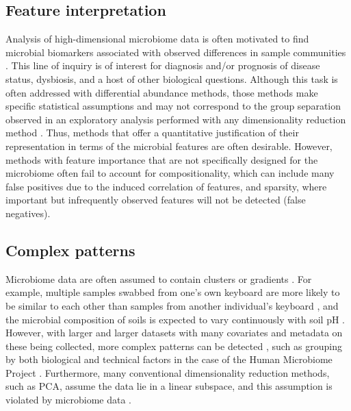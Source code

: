 \subsection{Feature interpretation} Analysis of high-dimensional microbiome data is often motivated to find microbial biomarkers associated with observed differences in sample communities \cite{Fedarko2020-oy}. This line of inquiry is of interest for diagnosis and/or prognosis of disease status, dysbiosis, and a host of other biological questions. Although this task is often addressed with differential abundance methods, those methods make specific statistical assumptions and may not correspond to the group separation observed in an exploratory analysis performed with any dimensionality reduction method \cite{Lin2020-vq}. Thus, methods that offer a quantitative justification of their representation in terms of the microbial features are often desirable. However, methods with feature importance that are not specifically designed for the microbiome often fail to account for compositionality, which can include many false positives due to the induced correlation of features, and sparsity, where important but infrequently observed features will not be detected (false negatives).

\subsection{Complex patterns} Microbiome data are often assumed to contain clusters or gradients \cite{Kuczynski2010-gu}. For example, multiple samples swabbed from one's own keyboard are more likely to be similar to each other than samples from another individual's keyboard \cite{Fierer2010-dp}, and the microbial composition of soils is expected to vary continuously with soil pH \cite{Lauber2009-jo}. However, with larger and larger datasets with many covariates and metadata on these being collected, more complex patterns can be detected \cite{Debelius2016-ym}, such as grouping by both biological and technical factors in the case of the Human Microbiome Project \cite{The_Human_Microbiome_Project_Consortium2012-og}. Furthermore, many conventional dimensionality reduction methods, such as PCA, assume the data lie in a linear subspace, and this assumption is violated by microbiome data \cite{Potvin1993-fl,Tabachnick2013-vn,Ginter1979-ja,Greig-Smith1980-pt}.


